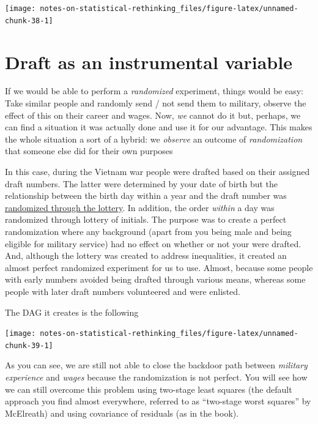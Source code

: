 \documentclass[
]{book}
\begin{document}
\begin{center}\texttt{[image: notes-on-statistical-rethinking\_files/figure-latex/unnamed-chunk-38-1]} \end{center}

\hypertarget{draft-as-an-instrumental-variable}{%
\section*{Draft as an instrumental variable}\label{draft-as-an-instrumental-variable}}

If we would be able to perform a \emph{randomized} experiment, things would be easy: Take similar people and randomly send / not send them to military, observe the effect of this on their career and wages. Now, \emph{we} cannot do it but, perhaps, we can find a situation it was actually done and use it for our advantage. This makes the whole situation a sort of a hybrid: we \emph{observe} an outcome of \emph{randomization} that someone else did for their own purposes

In this case, during the Vietnam war people were drafted based on their assigned draft numbers. The latter were determined by your date of birth but the relationship between the birth day within a year and the draft number was \href{https://en.wikipedia.org/wiki/Draft_lottery_(1969)}{randomized through the lottery}. In addition, the order \emph{within} a day was randomized through lottery of initials. The purpose was to create a perfect randomization where any background (apart from you being male and being eligible for military service) had no effect on whether or not your were drafted. And, although the lottery was created to address inequalities, it created an almost perfect randomized experiment for us to use. Almost, because some people with early numbers avoided being drafted through various means, whereas some people with later draft numbers volunteered and were enlisted.

The DAG it creates is the following

\begin{center}\texttt{[image: notes-on-statistical-rethinking\_files/figure-latex/unnamed-chunk-39-1]} \end{center}

As you can see, we are still not able to close the backdoor path between \emph{military experience} and \emph{wages} because the randomization is not perfect. You will see how we can still overcome this problem using two-stage least squares (the default approach you find almost everywhere, referred to as ``two-stage worst squares'' by McElreath) and using covariance of residuals (as in the book).
\end{document}
